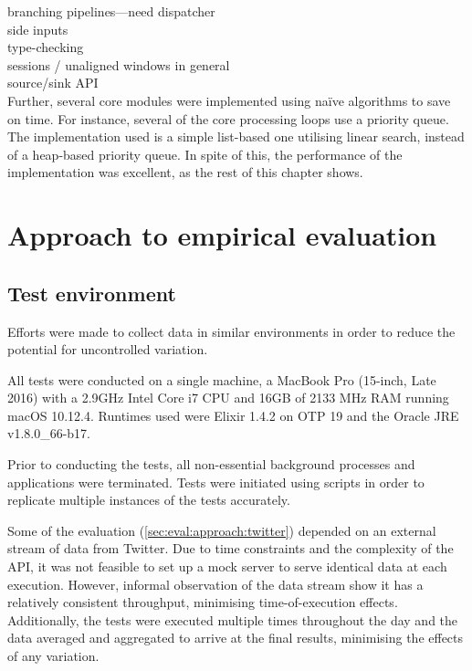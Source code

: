 branching pipelines---need dispatcher\\
side inputs\\
type-checking\\
sessions / unaligned windows in general\\
source/sink API\\

Further, several core modules were implemented using na\"ive algorithms to save on time.
For instance, several of the core processing loops use a priority queue.
The implementation used is a simple list-based one utilising linear search, instead of a heap-based priority queue.
In spite of this, the performance of the implementation was excellent, as the rest of this chapter shows.

\section{Approach to empirical evaluation}\label{sec:eval:approach}

\subsection{Test environment}\label{sec:eval:approach:environment}

Efforts were made to collect data in similar environments in order to reduce the potential for uncontrolled variation.

All tests were conducted on a single machine, a MacBook Pro (15-inch, Late 2016) with a 2.9GHz Intel Core i7 CPU and 16GB of 2133 MHz RAM running macOS 10.12.4.
Runtimes used were Elixir 1.4.2 on OTP 19 and the Oracle JRE v1.8.0\_66-b17.

Prior to conducting the tests, all non-essential background processes and applications were terminated.
Tests were initiated using scripts in order to replicate multiple instances of the tests accurately.

Some of the evaluation (\cref{sec:eval:approach:twitter}) depended on an external stream of data from Twitter.
Due to time constraints and the complexity of the API, it was not feasible to set up a mock server to serve identical data at each execution.
However, informal observation of the data stream show it has a relatively consistent throughput, minimising time-of-execution effects.
Additionally, the tests were executed multiple times throughout the day and the data averaged and aggregated to arrive at the final results, minimising the effects of any variation.

